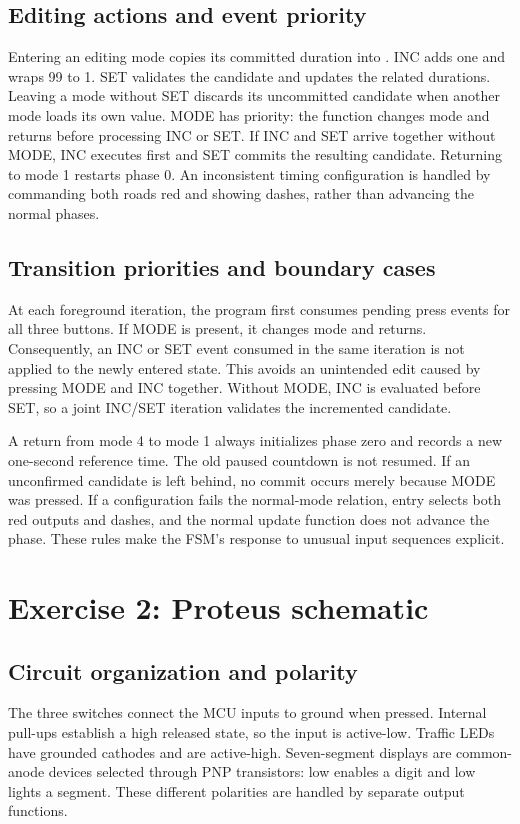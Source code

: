 \documentclass[a4paper]{article}
\newcommand{\code}[1]{\texttt{\detokenize{#1}}}
\newcommand{\topic}[1]{\subsection{#1}}
\begin{document}
\topic{Editing actions and event priority}
Entering an editing mode copies its committed duration into
\code{edit_value}. INC adds one and wraps 99 to 1. SET validates the candidate
and updates the related durations. Leaving a mode without SET discards its
uncommitted candidate when another mode loads its own value.
MODE has priority: the function changes mode and returns before processing
INC or SET. If INC and SET arrive together without MODE, INC executes first
and SET commits the resulting candidate. Returning to mode 1 restarts phase 0.
An inconsistent timing configuration is handled by commanding both roads red
and showing dashes, rather than advancing the normal phases.

\topic{Transition priorities and boundary cases}

At each foreground iteration, the program first consumes pending press events
for all three buttons. If MODE is present, it changes mode and returns.
Consequently, an INC or SET event consumed in the same iteration is not applied
to the newly entered state. This avoids an unintended edit caused by pressing
MODE and INC together. Without MODE, INC is evaluated before SET, so a joint
INC/SET iteration validates the incremented candidate.

A return from mode 4 to mode 1 always initializes phase zero and records a new
one-second reference time. The old paused countdown is not resumed. If an
unconfirmed candidate is left behind, no commit occurs merely because MODE was
pressed. If a configuration fails the normal-mode relation, entry selects both
red outputs and dashes, and the normal update function does not advance the
phase. These rules make the FSM's response to unusual input sequences explicit.


\clearpage
\section{Exercise 2: Proteus schematic}

\topic{Circuit organization and polarity}
The three switches connect the MCU inputs to ground when pressed.
Internal pull-ups establish a high released state, so the input is active-low.
Traffic LEDs have grounded cathodes and are active-high. Seven-segment displays
are common-anode devices selected through PNP transistors: low enables a digit
and low lights a segment. These different polarities are handled by separate
output functions.
\end{document}
